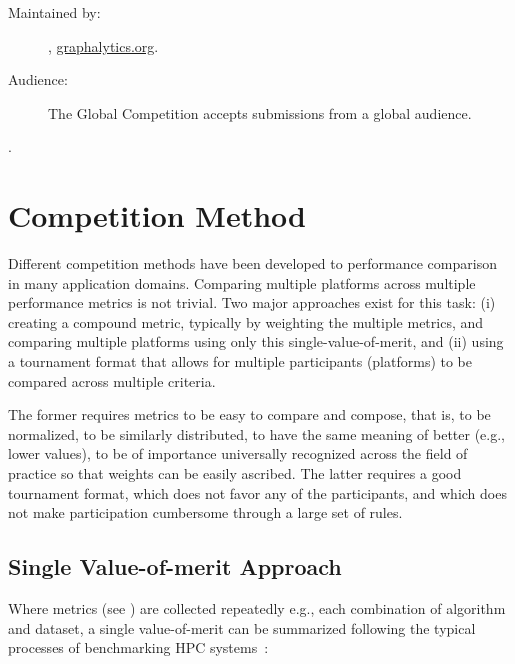 \begin{description}
    \item[Maintained by:] \toolname, \url{graphalytics.org}.
    \item[Audience:] The Global \toolname{} Competition accepts submissions from a global audience.
\end{description} 



 .








\section{Competition Method} \label{sec:competitions}
Different competition methods have been developed to performance comparison in many application domains. Comparing multiple platforms across multiple performance metrics is not trivial. Two major approaches exist for this task: (i) creating a compound metric, typically by weighting the multiple metrics, and comparing multiple platforms using only this single-value-of-merit, and (ii) using a tournament format that allows for multiple participants (platforms) to be compared across multiple criteria. 

The former requires metrics to be easy to compare and compose, that is, to be normalized, to be similarly distributed, to have the same meaning of better (e.g., lower values), to be of importance universally recognized across the field of practice so that weights can be easily ascribed. The latter requires a good tournament format, which does not favor any of the participants, and which does not make participation cumbersome through a large set of rules.


\subsection{Single Value-of-merit Approach} \label{sec:competitions:single_value}
Where metrics (see ) are collected repeatedly e.g., each combination of algorithm and dataset, a single value-of-merit can be summarized following the typical processes of benchmarking HPC systems~\cite{DBLP:conf/sc/HoeflerB15}:

